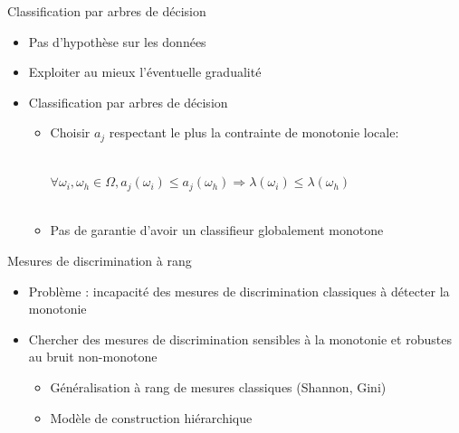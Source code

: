 \documentclass{beamer}
\begin{document}
\begin{frame}{Classification par arbres de décision}
\begin{itemize}
\item Pas d'hypothèse sur les données
\item Exploiter au mieux l'éventuelle gradualité
\item Classification par arbres de décision 
\begin{itemize}
\item Choisir $a_j$ respectant le plus la contrainte de monotonie locale: \\~\

$\forall \omega_i, \omega_h \in \Omega, a_j(\omega_i) \leq a_j(\omega_h) \Rightarrow \lambda(\omega_i) \leq \lambda(\omega_h)$ \\~\

\item Pas de garantie d'avoir un classifieur globalement monotone

\end{itemize}
\end{itemize}

\end{frame}

\begin{frame}{Mesures de discrimination à rang}
\begin{itemize}
\item Problème : incapacité des mesures de discrimination classiques à détecter la monotonie 
\item Chercher des mesures de discrimination sensibles à la monotonie et robustes au bruit non-monotone
\begin{itemize}
\item Généralisation à rang de mesures classiques (Shannon, Gini)
\item Modèle de construction hiérarchique 
\end{itemize}
\end{itemize}
\end{frame}
\end{document}
